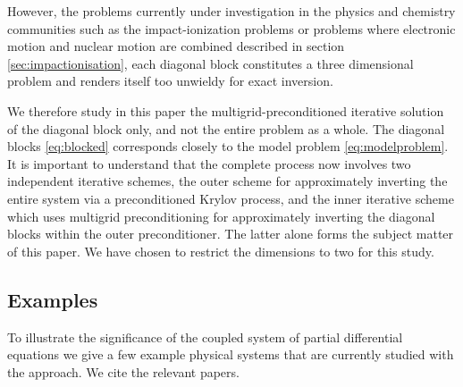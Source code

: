 \documentclass[mathpazo]{cicp}
\theoremstyle{definition}
\numberwithin{equation}{section}
\providecommand{\wv}{}
\providecommand{\hbz}{}
\begin{document}
\wv{
However, the problems currently under investigation in the physics and
chemistry communities such as the impact-ionization problems or
problems where electronic motion and nuclear motion are combined
described in section \ref{sec:impactionisation}, each diagonal block
\hbz{constitutes} a three dimensional problem and \hbz{renders itself too unwieldy for exact inversion}}. 

We therefore study in this paper the \hbz{multigrid-preconditioned iterative solution of the diagonal block only, and not the entire problem as a whole. The diagonal blocks \eqref{eq:blocked} corresponds closely to the model problem \eqref{eq:modelproblem}. It is important to understand that the complete process now involves two independent iterative schemes, the outer scheme for approximately inverting the entire system via a preconditioned Krylov process, and the inner iterative scheme which uses multigrid preconditioning for approximately inverting the diagonal blocks within the outer preconditioner. The latter alone forms the subject matter of this paper. We have chosen to restrict the dimensions to two for this study.}


\subsection{Examples}
\wv{To illustrate the significance of the coupled system of partial
differential equations we give a few example physical systems that are
currently studied with the approach. We cite the relevant papers.}
\end{document}
